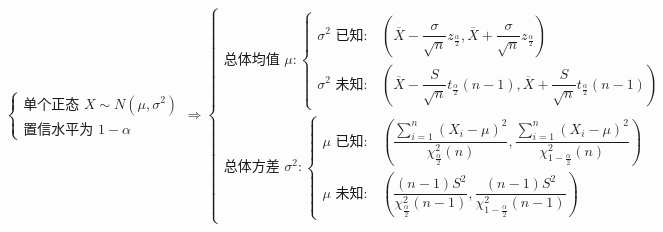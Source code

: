 \documentclass[lang=cn,11pt]{elegantbook}
\begin{document}
\[
\begin{cases}
\text{单个正态 } X\sim N(\mu,\sigma^2) \\
\text{置信水平为 } 1-\alpha
\end{cases}
\Rightarrow
\begin{cases}
\text{总体均值 } \mu:
\begin{cases}
\sigma^2 \text{ 已知}: & \left( \overline{X} - \dfrac{\sigma}{\sqrt{n}} z_{\frac{\alpha}{2}}, \overline{X} + \dfrac{\sigma}{\sqrt{n}} z_{\frac{\alpha}{2}} \right)\\[4pt]
\sigma^2 \text{ 未知}: & \left( \overline{X} - \dfrac{S}{\sqrt{n}} t_{\frac{\alpha}{2}}(n-1), \overline{X} + \dfrac{S}{\sqrt{n}} t_{\frac{\alpha}{2}}(n-1) \right)
\end{cases}\\[8pt]
\text{总体方差 } \sigma^2:
\begin{cases}
\mu \text{ 已知}: & \left( \dfrac{\sum_{i=1}^n (X_i-\mu)^2}{\chi_{\frac{\alpha}{2}}^2(n)}, \dfrac{\sum_{i=1}^n (X_i-\mu)^2}{\chi_{1-\frac{\alpha}{2}}^2(n)} \right)\\[4pt]
\mu \text{ 未知}: & \left( \dfrac{(n-1)S^2}{\chi_{\frac{\alpha}{2}}^2(n-1)}, \dfrac{(n-1)S^2}{\chi_{1-\frac{\alpha}{2}}^2(n-1)} \right)
\end{cases}
\end{cases}
\]
\end{document}
